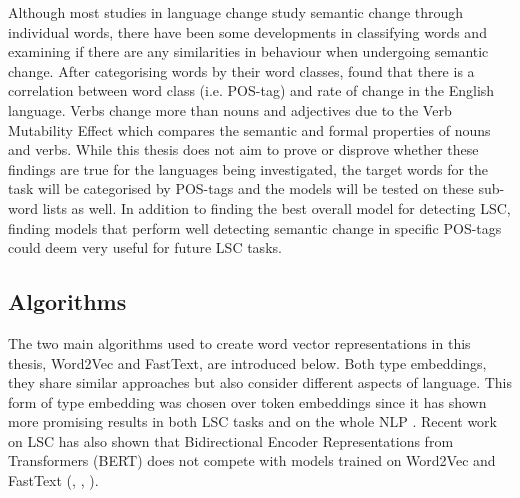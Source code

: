 
Although most studies in language change study semantic change through individual words, there have been some developments in classifying words and examining if there are any similarities in behaviour when undergoing semantic change. After categorising words by their word classes, \citet{dubossarsky2018semantic} found that there is a correlation between word class (i.e. POS-tag) and rate of change in the English language. Verbs change more than nouns and adjectives due to the Verb Mutability Effect which compares the semantic and formal properties of nouns and verbs. While this thesis does not aim to prove or disprove whether these findings are true for the languages being investigated, the target words for the task will be categorised by POS-tags and the models will be tested on these sub-word lists as well. In addition to finding the best overall model for detecting LSC, finding models that perform well detecting semantic change in specific POS-tags could deem very useful for future LSC tasks. 


\subsection{Algorithms}

The two main algorithms used to create word vector representations in this thesis, Word2Vec and FastText, are introduced below. Both type embeddings, they share similar approaches but also consider different aspects of language. This form of type embedding was chosen over token embeddings since it has shown more promising results in both LSC tasks and on the whole NLP \citep{baroni-etal-2014-dont}. Recent work on LSC has also shown that Bidirectional Encoder Representations from Transformers (BERT) does not compete with models trained on Word2Vec and FastText (\citet{schlechtweg-etal-2020-semeval}, \citet{kaiser-diacrita2020}, \citet{laicher-2020}). 

